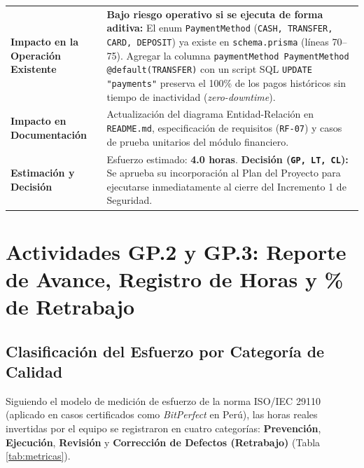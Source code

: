 \documentclass[11pt,a4paper]{article}
\begin{document}
\begin{table}[h!]
\begin{tabular}{@{}p{4.2cm}p{11.3cm}@{}}
\textbf{Impacto en la Operación Existente} & \textbf{Bajo riesgo operativo si se ejecuta de forma aditiva:} El enum \texttt{PaymentMethod} (\texttt{CASH, TRANSFER, CARD, DEPOSIT}) ya existe en \texttt{schema.prisma} (líneas 70--75). Agregar la columna \texttt{paymentMethod PaymentMethod @default(TRANSFER)} con un script SQL \texttt{UPDATE "payments"} preserva el 100\% de los pagos históricos sin tiempo de inactividad (\textit{zero-downtime}). \\
\textbf{Impacto en Documentación} & Actualización del diagrama Entidad-Relación en \texttt{README.md}, especificación de requisitos (\texttt{RF-07}) y casos de prueba unitarios del módulo financiero. \\
\textbf{Estimación y Decisión} & Esfuerzo estimado: \textbf{4.0 horas}. \textbf{Decisión (\texttt{GP, LT, CL}):} Se aprueba su incorporación al Plan del Proyecto para ejecutarse inmediatamente al cierre del Incremento 1 de Seguridad. \\
\bottomrule
\end{tabular}
\end{table}

\section{Actividades GP.2 y GP.3: Reporte de Avance, Registro de Horas y \% de Retrabajo}

\subsection{Clasificación del Esfuerzo por Categoría de Calidad}
Siguiendo el modelo de medición de esfuerzo de la norma ISO/IEC 29110 (aplicado en casos certificados como \textit{BitPerfect} en Perú), las horas reales invertidas por el equipo se registraron en cuatro categorías: \textbf{Prevención}, \textbf{Ejecución}, \textbf{Revisión} y \textbf{Corrección de Defectos (Retrabajo)} (Tabla \ref{tab:metricas}).
\end{document}

